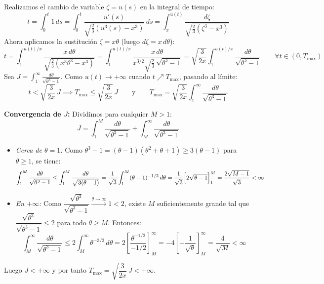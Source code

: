 {    Realizamos el cambio de variable $\zeta = u(s)$ en la integral de tiempo:
    \[
        t = \int_0^t 1\, ds = \int_0^t \frac{u'(s)}{\sqrt{\tfrac{2}{3}(u^3(s)-x^3)}}\, ds = \int_x^{u(t)} \frac{d\zeta}{\sqrt{\tfrac{2}{3}(\zeta^3 - x^3)}}
    \]
    Ahora aplicamos la sustitución $\zeta = x\theta$ (luego $d\zeta = x\, d\theta$):
    \[
        t = \int_1^{u(t)/x} \frac{x\, d\theta}{\sqrt{\tfrac{2}{3}(x^3\theta^3 - x^3)}} = \int_1^{u(t)/x} \frac{x\, d\theta}{x^{3/2}\sqrt{\tfrac{2}{3}}\,\sqrt{\theta^3 - 1}} = \sqrt{\frac{3}{2x}} \int_1^{u(t)/x} \frac{d\theta}{\sqrt{\theta^3 - 1}} \qquad \forall t \in (0, T_{\max})
    \]
    Sea $J = \displaystyle\int_1^\infty \frac{d\theta}{\sqrt{\theta^3-1}}$. Como $u(t) \to +\infty$ cuando $t \nearrow T_{\max}$, pasando al límite:
    \[
        t < \sqrt{\frac{3}{2x}}\, J \implies T_{\max} \leq \sqrt{\frac{3}{2x}}\, J \qquad \text{y} \qquad T_{\max} = \sqrt{\frac{3}{2x}} \int_1^\infty \frac{d\theta}{\sqrt{\theta^3-1}}
    \]

    \medskip

    \textbf{Convergencia de $J$:} Dividimos para cualquier $M > 1$:
    \[
        J = \int_1^M \frac{d\theta}{\sqrt{\theta^3-1}} + \int_M^\infty \frac{d\theta}{\sqrt{\theta^3-1}}
    \]
    \begin{itemize}
        \item \textit{Cerca de $\theta = 1$:} Como $\theta^3 - 1 = (\theta-1)(\theta^2+\theta+1) \geq 3(\theta-1)$ para $\theta \geq 1$, se tiene:
        \[
            \int_1^M \frac{d\theta}{\sqrt{\theta^3-1}} \leq \int_1^M \frac{d\theta}{\sqrt{3(\theta-1)}} = \frac{1}{\sqrt{3}} \int_1^M (\theta-1)^{-1/2}\, d\theta = \frac{1}{\sqrt{3}} \Bigl[ 2\sqrt{\theta-1} \Bigr]_1^M = \frac{2\sqrt{M-1}}{\sqrt{3}} < \infty
        \]
        \item \textit{En $+\infty$:} Como $\dfrac{\sqrt{\theta^3}}{\sqrt{\theta^3-1}} \xrightarrow{\theta \to \infty} 1 < 2$, existe $M$ suficientemente grande tal que $\dfrac{\sqrt{\theta^3}}{\sqrt{\theta^3-1}} \leq 2$ para todo $\theta \geq M$. Entonces:
        \[
            \int_M^\infty \frac{d\theta}{\sqrt{\theta^3-1}} \leq 2\int_M^\infty \theta^{-3/2}\, d\theta = 2\left[\frac{\theta^{-1/2}}{-1/2}\right]_M^\infty = -4\left[-\frac{1}{\sqrt{\theta}}\right]_M^\infty = \frac{4}{\sqrt{M}} < \infty
        \]
    \end{itemize}
    Luego $J < +\infty$ y por tanto $T_{\max} = \sqrt{\dfrac{3}{2x}}\, J < +\infty$.

}
